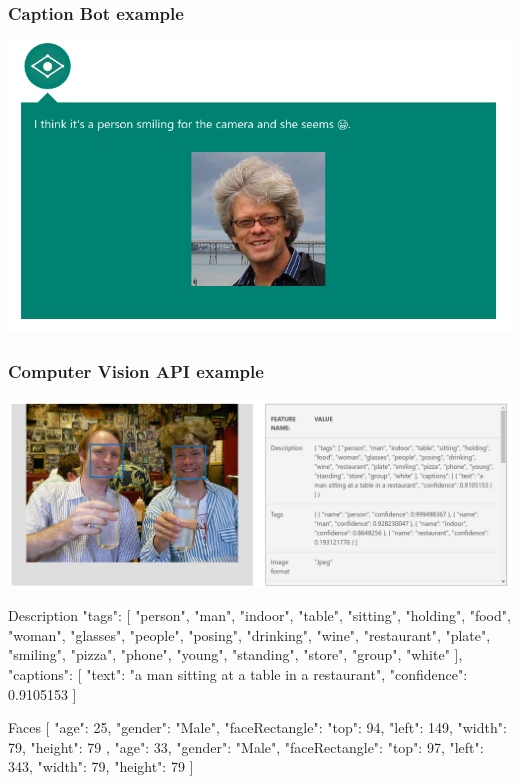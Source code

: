 \documentclass[xcolor=dvipsnames]{beamer}
\begin{document}
		\begin{frame}
			\frametitle{Caption Bot example}
			\begin{center}
				\includegraphics[width=\textwidth]{images/caption_detmar.png}
			\end{center}
		\end{frame}
	
		\begin{frame}
			\frametitle{Computer Vision API example}
			\begin{center}
				\includegraphics[width=\textwidth]{images/detmar_api.png}
			\end{center}
			\begin{itemize}
				\footnotesize{
					\item Description	{ "tags": [ "person", "man", "indoor", "table", "sitting", "holding", "food", "woman", "glasses", "people", "posing", "drinking", "wine", "restaurant", "plate", "smiling", "pizza", "phone", "young", "standing", "store", "group", "white" ], "captions": [ { "text": "a man sitting at a table in a restaurant", "confidence": 0.9105153 } ] }
					\item Faces	[ { "age": 25, "gender": "Male", "faceRectangle": { "top": 94, "left": 149, "width": 79, "height": 79 } }, { "age": 33, "gender": "Male", "faceRectangle": { "top": 97, "left": 343, "width": 79, "height": 79 } } ]
				}
			\end{itemize}
		\end{frame}
	
\end{document}
